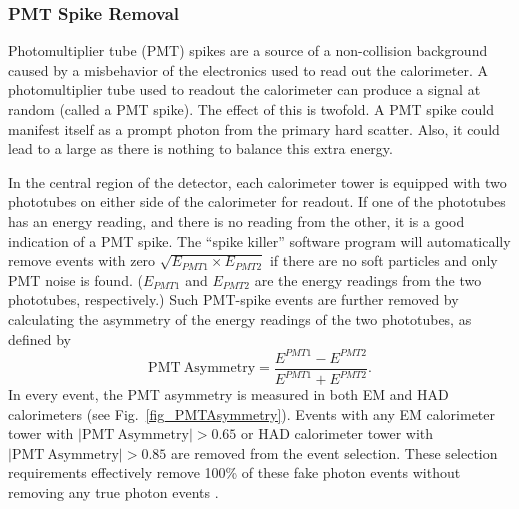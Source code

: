 \subsubsection{PMT Spike Removal}\label{pmtspikes}
Photomultiplier tube (PMT) spikes are a source of a non-collision background caused by a misbehavior of the electronics used to read out the calorimeter. A photomultiplier tube used to readout the calorimeter can produce a signal at random (called a PMT spike). The effect of this is twofold. A PMT spike could manifest itself as a prompt photon from the primary hard scatter. Also, it could lead to a large \met as there is nothing to balance this extra energy.

In the central region of the detector, each calorimeter tower is equipped with two phototubes on either side of the calorimeter for readout. If one of the phototubes has an energy reading, and there is no reading from the other, it is a good indication of a PMT spike. The ``spike killer'' software program will automatically remove events with zero $\sqrt{E_{PMT1}\times E_{PMT2}}$ if there are no soft particles and only PMT noise is found. ($E_{PMT1}$ and $E_{PMT2}$ are the energy readings from the two phototubes, respectively.) Such PMT-spike events are further removed by calculating the asymmetry of the energy readings of the two phototubes, as defined by
\begin{equation}
\mathrm{PMT~Asymmetry} = \frac{E^{PMT1} - E^{PMT2}}{E^{PMT1} + E^{PMT2}}.
\label{eqa_PMTAsymmetry}
\end{equation}
In every event, the PMT asymmetry is measured in both EM and HAD calorimeters (see Fig.~\ref{fig_PMTAsymmetry}). Events with any EM calorimeter tower with $\mathrm{|PMT~Asymmetry}| > 0.65$ or HAD calorimeter tower with $\mathrm{|PMT~Asymmetry}| > 0.85$ \cite{cdfnote:9184} are removed from the event selection. These selection requirements effectively remove 100\% of these fake photon events without removing any true photon events \cite{cdfnote:7960}.

